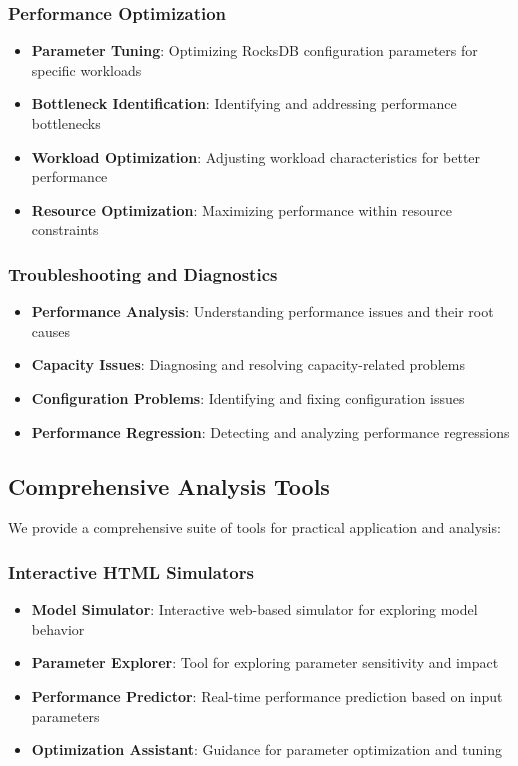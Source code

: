 \documentclass[11pt]{article}
\begin{document}
\subsubsection{Performance Optimization}
\begin{itemize}
    \item \textbf{Parameter Tuning}: Optimizing RocksDB configuration parameters for specific workloads
    \item \textbf{Bottleneck Identification}: Identifying and addressing performance bottlenecks
    \item \textbf{Workload Optimization}: Adjusting workload characteristics for better performance
    \item \textbf{Resource Optimization}: Maximizing performance within resource constraints
\end{itemize}

\subsubsection{Troubleshooting and Diagnostics}
\begin{itemize}
    \item \textbf{Performance Analysis}: Understanding performance issues and their root causes
    \item \textbf{Capacity Issues}: Diagnosing and resolving capacity-related problems
    \item \textbf{Configuration Problems}: Identifying and fixing configuration issues
    \item \textbf{Performance Regression}: Detecting and analyzing performance regressions
\end{itemize}

\subsection{Comprehensive Analysis Tools}

We provide a comprehensive suite of tools for practical application and analysis:

\subsubsection{Interactive HTML Simulators}
\begin{itemize}
    \item \textbf{Model Simulator}: Interactive web-based simulator for exploring model behavior
    \item \textbf{Parameter Explorer}: Tool for exploring parameter sensitivity and impact
    \item \textbf{Performance Predictor}: Real-time performance prediction based on input parameters
    \item \textbf{Optimization Assistant}: Guidance for parameter optimization and tuning
\end{itemize}
\end{document}

